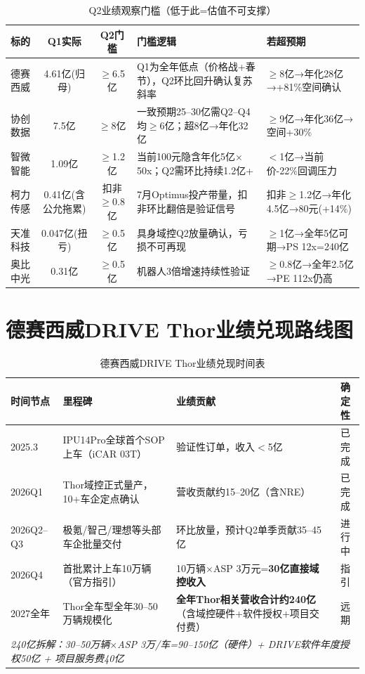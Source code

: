 \begin{table}[H]
\centering\scriptsize
\renewcommand{\arraystretch}{1.15}
\begin{tabularx}{\textwidth}{l c c X X}
\toprule
\textbf{标的} & \textbf{Q1实际} & \textbf{Q2门槛} & \textbf{门槛逻辑} & \textbf{若超预期} \\
\midrule
德赛西威 & 4.61亿(归母) & $\geq$6.5亿 & Q1为全年低点（价格战+春节），Q2环比回升确认复苏斜率 & $\geq$8亿→年化28亿→+81\%空间确认 \\
协创数据 & 7.5亿 & $\geq$8亿 & 一致预期25--30亿需Q2--Q4均$\geq$6亿；超8亿→年化32亿 & $\geq$9亿→年化36亿→空间+30\% \\
智微智能 & 1.09亿 & $\geq$1.2亿 & 当前100元隐含年化5亿$\times$50x；Q2需环比持续1.2亿+ & $<$1亿→当前价-22\%回调压力 \\
柯力传感 & 0.41亿(含公允拖累) & 扣非$\geq$0.8亿 & 7月Optimus投产带量，扣非环比翻倍是验证信号 & 扣非$\geq$1.2亿→年化4.5亿→80元(+14\%) \\
天准科技 & 0.047亿(扭亏) & $\geq$0.5亿 & 具身域控Q2放量确认，亏损不可再现 & $\geq$1亿→全年5亿可期→PS 12x=240亿 \\
奥比中光 & 0.31亿 & $\geq$0.5亿 & 机器人3倍增速持续性验证 & $\geq$0.8亿→全年2.5亿→PE 112x仍高 \\
\bottomrule
\end{tabularx}
\caption{Q2业绩观察门槛（低于此=估值不可支撑）}
\end{table}

\section{德赛西威DRIVE Thor业绩兑现路线图}

\begin{table}[H]
\centering\small
\renewcommand{\arraystretch}{1.2}
\begin{tabularx}{\textwidth}{l l X c}
\toprule
\textbf{时间节点} & \textbf{里程碑} & \textbf{业绩贡献} & \textbf{确定性} \\
\midrule
2025.3 & IPU14Pro全球首个SOP上车（iCAR 03T） & 验证性订单，收入$<$5亿 & \textcolor{riskgreen}{已完成} \\
2026Q1 & Thor域控正式量产，10+车企定点确认 & 营收贡献约15--20亿（含NRE） & \textcolor{riskgreen}{已完成} \\
2026Q2--Q3 & 极氪/智己/理想等头部车企批量交付 & 环比放量，预计Q2单季贡献35--45亿 & \textcolor{riskamber}{进行中} \\
2026Q4 & 首批累计上车10万辆（官方指引） & 10万辆$\times$ASP 3万元=\textbf{30亿直接域控收入} & \textcolor{riskamber}{指引} \\
2027全年 & Thor全车型全年30--50万辆规模化 & \textbf{全年Thor相关营收合计约240亿}（含域控硬件+软件授权+项目交付费） & 远期 \\
\midrule
\multicolumn{4}{l}{\textit{240亿拆解：30--50万辆$\times$ASP 3万/车=90--150亿（硬件）+ DRIVE软件年度授权50亿 + 项目服务费40亿}} \\
\bottomrule
\end{tabularx}
\caption{德赛西威DRIVE Thor业绩兑现时间表}
\end{table}

